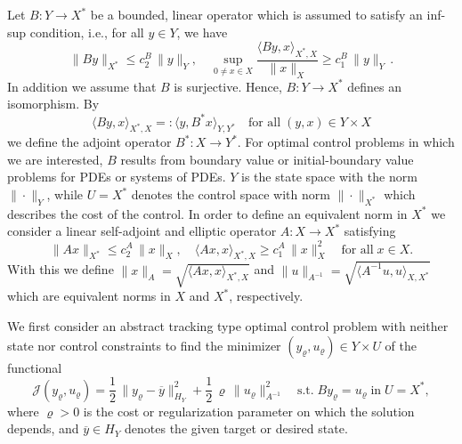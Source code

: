 \documentclass{article}
\numberwithin{equation}{section}
\begin{document}
Let $ B : Y \to X^*$ be a bounded, linear operator which is assumed to
satisfy an inf-sup condition, i.e., for all $y \in Y$, we have
\[
  \| B y \|_{X^*} \leq c_2^B \, \| y \|_Y, \quad
  \sup\limits_{0 \neq x \in X}
  \frac{\langle B y , x \rangle_{X^*,X}}{\| x \|_X} \geq c_1^B \, \| y \|_Y
  \, .
\]
In addition we assume that $B$ is surjective.
Hence,
$B : Y \to X^*$ defines an isomorphism. By
\[
  \langle By , x \rangle_{X^*,X} =: \langle y , B^* x \rangle_{Y,Y^*}
  \quad \mbox{for all} \; (y,x) \in Y \times X
\]
we define the adjoint operator $B^* : X \to Y^*$.
For optimal control problems in which we are interested, $B$ 
results from boundary value or initial-boundary value problems 
for PDEs or systems of PDEs.
$Y$ is the state space with the norm $\| \cdot \|_Y$, 
while $U = X^*$ denotes the control space with norm $\| \cdot \|_{X^*}$
which describes the cost of the control. In order to define an equivalent
norm in $X^*$ we consider a linear self-adjoint and elliptic
operator $A : X \to X^*$ satisfying
\[
  \| A x \|_{X^*} \leq c_2^A \, \| x \|_X, \quad
  \langle A x , x \rangle_{X^*,X} \geq c_1^A \, \| x \|_X^2
  \quad \mbox{for all} \; x \in X .
\]
With this we define
$\| x \|_A = \sqrt{\langle A x,x \rangle_{X^*,X}}$ and
$\| u \|_{A^{-1}} = \sqrt{\langle A^{-1} u , u \rangle_{X,X^*}}$
which are equivalent norms in $X$ and $X^*$, respectively.

We first consider an abstract tracking type optimal control problem with
neither state nor control constraints to find the minimizer
$(y_\varrho, u_\varrho) \in Y \times U$ of the functional
\begin{equation}\label{Eqn:AbstractOCP:AbstractOCP}
  {\mathcal{J}}(y_\varrho,u_\varrho) = \frac{1}{2} \,
  \| y_\varrho - \overline{y} \|_{H_Y}^2 + \frac{1}{2} \, \varrho \,
  \| u_\varrho \|^2_{A^{-1}} \quad
  \mbox{s.t.} 
  \; B y_\varrho = u_\varrho \; \mbox{in} \; U=X^* ,
\end{equation}
where $\varrho > 0$ is the cost or regularization parameter
on which the solution depends, and $\overline{y} \in H_Y$ denotes the 
given target or desired state.
\end{document}
